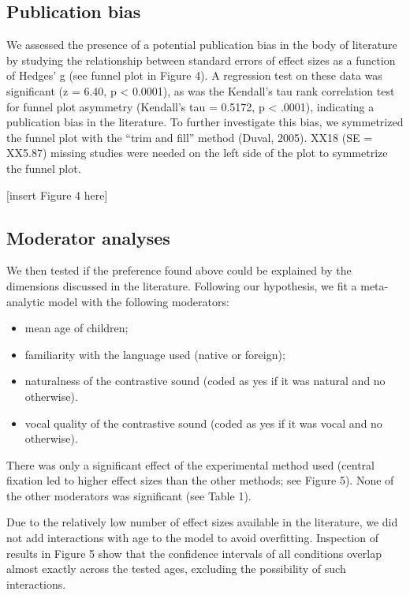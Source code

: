 \documentclass[man]{apa6}
\providecommand{\tightlist}{%
  \setlength{\itemsep}{0pt}\setlength{\parskip}{0pt}}
\begin{document}
\subsection{Publication bias}\label{publication-bias}

We assessed the presence of a potential publication bias in the body of
literature by studying the relationship between standard errors of
effect sizes as a function of Hedges' g (see funnel plot in Figure 4). A
regression test on these data was significant (z = 6.40, p \textless{}
0.0001), as was the Kendall's tau rank correlation test for funnel plot
asymmetry (Kendall's tau = 0.5172, p \textless{} .0001), indicating a
publication bias in the literature. To further investigate this bias, we
symmetrized the funnel plot with the \enquote{trim and fill} method
(Duval, 2005). XX18 (SE = XX5.87) missing studies were needed on the
left side of the plot to symmetrize the funnel plot.

{[}insert Figure 4 here{]}

\subsection{Moderator analyses}\label{moderator-analyses}

We then tested if the preference found above could be explained by the
dimensions discussed in the literature. Following our hypothesis, we fit
a meta-analytic model with the following moderators:

\begin{itemize}
\tightlist
\item
  mean age of children;
\item
  familiarity with the language used (native or foreign);
\item
  naturalness of the contrastive sound (coded as yes if it was natural
  and no otherwise).
\item
  vocal quality of the contrastive sound (coded as yes if it was vocal
  and no otherwise).
\end{itemize}

There was only a significant effect of the experimental method used
(central fixation led to higher effect sizes than the other methods; see
Figure 5). None of the other moderators was significant (see Table 1).

Due to the relatively low number of effect sizes available in the
literature, we did not add interactions with age to the model to avoid
overfitting. Inspection of results in Figure 5 show that the confidence
intervals of all conditions overlap almost exactly across the tested
ages, excluding the possibility of such interactions.
\end{document}
